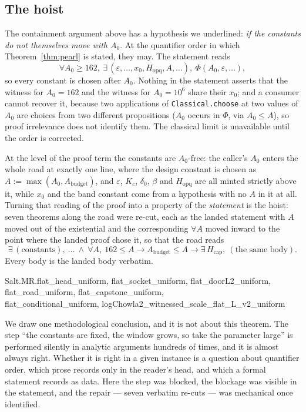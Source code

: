 \documentclass[11pt]{amsart}
\newcommand{\leanname}[1]{\par{\noindent\small\ttfamily\raggedright #1\par}}
\theoremstyle{remark}
\begin{document}
\subsection{The hoist}
The containment argument above has a hypothesis we underlined: \emph{if
the constants do not themselves move with $A_0$}. At the quantifier order
in which Theorem~\ref{thm:pearl} is stated, they may. The statement reads
\[
\forall A_0 \ge 162,\ \exists\,(\varepsilon, \ldots, x_0,
H_{\mathrm{opq}}, A, \ldots),\ \Phi(A_0, \varepsilon,\ldots),
\]
so every constant is chosen after $A_0$. Nothing in the statement asserts
that the witness for $A_0 = 162$ and the witness for $A_0 = 10^{6}$ share
their $x_0$; and a consumer cannot recover it, because two applications of
\texttt{Classical.choose} at two values of $A_0$ are choices from two
different propositions ($A_0$ occurs in $\Phi$, via $A_0 \le A$), so proof
irrelevance does not identify them. The classical limit is unavailable
until the order is corrected.

At the level of the proof term the constants are $A_0$-free: the caller's
$A_0$ enters the whole road at exactly one line, where the design constant
is chosen as $A := \max(A_0, A_{\mathrm{budget}})$, and
$\varepsilon$, $K_c$, $\delta_0$, $\beta$ and $H_{\mathrm{opq}}$ are all
minted strictly above it, while $x_0$ and the band constant come from a
hypothesis with no $A$ in it at all. Turning that reading of the proof
into a property of the \emph{statement} is the hoist: seven theorems along
the road were re-cut, each as the landed statement with $A$ moved out of
the existential and the corresponding $\forall A$ moved inward to the
point where the landed proof chose it, so that the road reads
\[
\exists\,(\text{constants}),\ \ldots \ \wedge\ \forall A,\ 162 \le A
\to A_{\mathrm{budget}} \le A \to \exists\,H_{\mathrm{cap}},\ (\text{the
same body}).
\]
Every body is the landed body verbatim.
\leanname{Salt.MR.flat\_head\_uniform, flat\_socket\_uniform,
flat\_doorL2\_uniform, flat\_road\_uniform, flat\_capstone\_uniform,\\
flat\_conditional\_uniform,
logChowla2\_witnessed\_scale\_\allowbreak flat\_L\_v2\_uniform}

We draw one methodological conclusion, and it is not about this theorem.
The step ``the constants are fixed, the window grows, so take the
parameter large'' is performed silently in analytic arguments hundreds of
times, and it is almost always right. Whether it is right in a given
instance is a question about quantifier order, which prose records only in
the reader's head, and which a formal statement records as data. Here the
step was blocked, the blockage was visible in the statement, and the
repair --- seven verbatim re-cuts --- was mechanical once identified.
\end{document}

